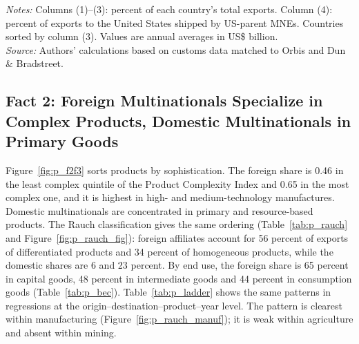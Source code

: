 \documentclass[11pt,a4paper]{article}
\begin{document}
\begin{table}[H]\centering\small%
  \caption{Exports to the United States and Exports by US-Parent Multinationals, by Exporting Country}%
  \label{tab:p_us3_tab}%
  \par\vspace{3pt}%
  \begin{minipage}{0.95\textwidth}\footnotesize %
  \textit{Notes:} Columns (1)--(3): percent of each country's total exports. Column (4): percent of exports to the United States shipped by US-parent MNEs. Countries sorted by column (3). Values are annual averages in US\$ billion.\\[3pt]%
  \textit{Source:} Authors' calculations based on customs data matched to Orbis and Dun \& Bradstreet.%
  \end{minipage}%
  \end{table}

\subsection{Fact 2: Foreign Multinationals Specialize in Complex Products, Domestic Multinationals in Primary Goods}
Figure~\ref{fig:p_f2f3} sorts products by sophistication. The foreign share is 0.46 in the least
complex quintile of the Product Complexity Index and 0.65 in the most complex one, and it is highest
in high- and medium-technology manufactures. Domestic multinationals are concentrated in primary
and resource-based products. The Rauch classification gives the same ordering
(Table~\ref{tab:p_rauch} and Figure~\ref{fig:p_rauch_fig}): foreign affiliates account for 56
percent of exports of differentiated products and 34 percent of homogeneous products, while the
domestic shares are 6 and 23 percent. By end use, the foreign share is 65 percent in capital goods,
48 percent in intermediate goods and 44 percent in consumption goods (Table~\ref{tab:p_bec}).
Table~\ref{tab:p_ladder} shows the same patterns in regressions at the origin--destination--product--year
level. The pattern is clearest within manufacturing (Figure~\ref{fig:p_rauch_manuf}); it is weak
within agriculture and absent within mining.
\end{document}
